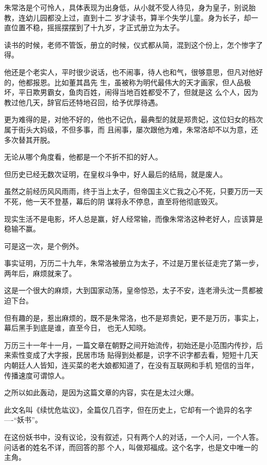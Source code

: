 \documentclass[11pt,a4paper,onecolumn]{article}
\begin{document}
朱常洛是个可怜人，具体表现为出身低，从小就不受人待见，身为皇子，别说胎教，连幼儿园都没上过，直到十二
岁才读书，算半个失学儿童。身为长子，却一直位置不稳，摇摇摆摆到了十九岁，才正式册立为太子。

读书的时候，老师不管饭，册立的时候，仪式都从简，混到这个份上，怎个惨字了得。

他还是个老实人，平时很少说话，也不闹事，待人也和气，很够意思，但凡对他好的，他都报恩。比如董其昌先
生，虽被称为明代最伟大的天才画家，但人品极坏，平日欺男霸女，鱼肉百姓，闹得当地百姓都受不了，但就是这
么个人，因为教过他几天，辞官后还特地召回，给予优厚待遇。

更为难得的是，对他不好的，他也不记仇，最典型的就是郑贵妃，这位妇女的档次属于街头大妈级，不但多事，而
且闹事，屡次跟他为难，朱常洛却不以为意，还多次替其开脱。

无论从哪个角度看，他都是一个不折不扣的好人。

但历史已经无数次证明，在皇权斗争中，好人最后的结局，就是废人。

虽然之前经历风风雨雨，终于当上太子，但帝国主义亡我之心不死，只要万历一天不死，他一天不登基，幕后的阴
谋将永不停息，直至将他彻底毁灭。

现实生活不是电影，坏人总是赢，好人经常输，而像朱常洛这种老好人，应该算是稳输不赢。

可是这一次，是个例外。

事实证明，万历二十九年，朱常洛被册立为太子，不过是万里长征走完了第一步，两年后，麻烦就来了。

这是一个很大的麻烦，大到国家动荡，皇帝惊恐，太子不安，连老滑头沈一贯都被迫下台。

但有趣的是，惹出麻烦的，既不是朱常洛，也不是郑贵妃，更不是万历，事实上，幕后黑手到底是谁，直至今日，
也无人知晓。

万历三十一年十一月，一篇文章在朝野之间开始流传，初始还是小范围内传抄，后来索性变成了大字报，民居市场
贴得到处都是，识字不识字都去看，短短十几天内朝廷人人皆知，连买菜的老大娘都知道了，在没有互联网和手机
短信的当年，传播速度可谓惊人。

之所以如此轰动，是因为这篇文章的内容，实在是太过火爆。

此文名叫《续忧危竑议》，全篇仅几百字，但在历史上，它却有一个诡异的名字----``妖书''。

在这份妖书中，没有议论，没有叙述，只有两个人的对话，一个人问，一个人答。问话者的姓名不详，而回答的那
个人，叫做郑福成。这个名字，也是文中唯一的主角。

\section[\thesection]{}
\end{document}
